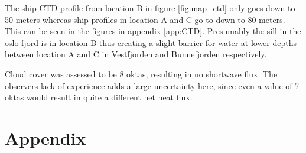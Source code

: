 \documentclass[a4paper,10pt,english]{article}
\begin{document}
The ship CTD profile from location B in figure \ref*{fig:map_ctd} only goes down to 50 meters whereas ship profiles in location A and C go to down to 80 meters. This can be seen in the figures in appendix \ref*{app:CTD}. Presumably the sill in the oslo fjord is in location B thus creating a slight barrier for water at lower depths between location A and C in Vestfjorden and Bunnefjorden respectively.

Cloud cover was assessed to be 8 oktas, resulting in no shortwave flux. The observers lack of experience adds a large uncertainty here, since even a value of 7 oktas would result in quite a different net heat flux.

\newpage
\appendix
\section{Appendix}
\end{document}
